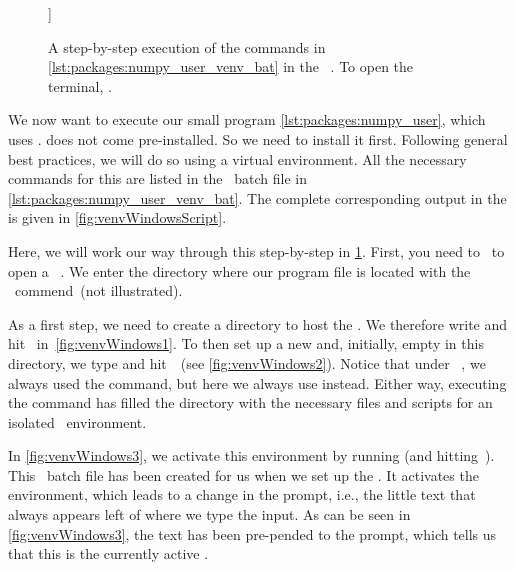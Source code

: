 \begin{figure}
]{}%
%
\floatRowSep%
%
%
%
\floatSep%
%
%
%
\caption{A step-by-step execution of the commands in \cref{lst:packages:numpy_user_venv_bat} in the \microsoftWindows\ . %
To open the terminal, \windowsTerminal.}%
\label{fig:venvWindows}%
\end{figure}%

We now want to execute our small program \cref{lst:packages:numpy_user}, which uses \numpy.
\numpy{} does not come pre-installed.
So we need to install it first.
Following general best practices, we will do so using a virtual environment.
All the necessary commands for this are listed in the \microsoftWindows\ batch file in \cref{lst:packages:numpy_user_venv_bat}.
The complete corresponding output in the  is given in \cref{fig:venvWindowsScript}.

Here, we will work our way through this step-by-step in \cref{fig:venvWindows}.
First, you need to \windowsTerminal\ to open a \microsoftWindows\ .
We enter the directory where our program file  is located with the ~commend~(not illustrated).

As a first step, we need to create a directory  to host the .
We therefore write  and hit~\keys{\return} in~\cref{fig:venvWindows1}.
To then set up a new and, initially, empty  in this directory, we type  and hit~\keys{\return}~(see \cref{fig:venvWindows2}).
Notice that under \ubuntu\ \linux, we always used the  command, but here we always use  instead.
Either way, executing the command has filled the directory  with the necessary files and scripts for an isolated \python\ environment.

In \cref{fig:venvWindows3}, we activate this environment by running  (and hitting~\keys{\return}).
This \microsoftWindows\ batch file has been created for us when we set up the .
It activates the environment, which leads to a change in the prompt, i.e., the little text that always appears left of where we type the input.
As can be seen in \cref{fig:venvWindows3}, the text  has been pre-pended to the prompt, which tells us that this is the currently active .

